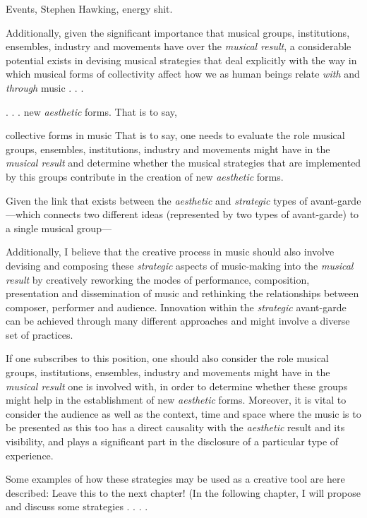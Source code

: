 Events, Stephen Hawking, energy shit.

Additionally, given the significant importance that musical groups, institutions, ensembles, industry and movements have over the \emph{musical result}, a considerable potential exists in devising musical strategies that deal explicitly with the way in which musical forms of collectivity affect how we as human beings relate \emph{with} and \emph{through} music . . . 

. . . new \emph{aesthetic} forms. That is to say, 

collective forms in music That is to say,  one needs to evaluate the role musical groups, ensembles, institutions, industry and movements might have in the \emph{musical result} and determine whether the musical strategies that are implemented by this groups contribute in the creation of new \emph{aesthetic} forms.

Given the link that exists between the \emph{aesthetic} and \emph{strategic} types of avant-garde---which connects two different ideas (represented by two types of avant-garde) to a single musical group--- 



Additionally, I believe that the creative process in music should also involve devising and composing these \emph{strategic} aspects of music-making into the \emph{musical result} by creatively reworking the modes of performance, composition, presentation and dissemination of music and rethinking the relationships between composer, performer and audience. Innovation within the \emph{strategic} avant-garde can be achieved through many different approaches and might involve a diverse set of practices. 


If one subscribes to this position, one should also consider the role musical groups, institutions, ensembles, industry and movements might have in the \emph{musical result} one is involved with, in order to determine whether these groups might help in the establishment of new \emph{aesthetic} forms. Moreover, it is vital to consider the audience as well as the context, time and space where the music is to be presented as this too has a direct causality with the \emph{aesthetic} result and its visibility, and plays a significant part in the disclosure of a particular type of experience. 


Some examples of how these strategies may be used as a creative tool are here described: Leave this to the next chapter! (In the following chapter, I will propose and discuss some strategies . . . .


